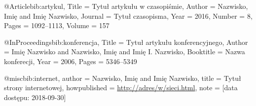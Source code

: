 @Article{bib:artykul,
Title                    = {Tytu{\l} artyku{\l}u w czasopi{\'{s}}mie},
Author                   = {Nazwisko, Imi{\k{e}} and Imi{\k{e}} Nazwisko},
Journal                  = {Tytu{\l} czasopisma},
Year                     = {2016},
Number                   = {8},
Pages                    = {1092--1113},
Volume                   = {157}
}

@InProceedings{bib:konferencja,
  Title                    = {Tytu{\l} artyku{\l}u konferencyjnego},
  Author                   = {Imi{\k{e}} Nazwisko and Nazwisko, Imi{\k{e}} and Imi{\k{e}} I. Nazwisko},
  Booktitle                = {Nazwa konferecji},
  Year                     = {2006},
  Pages                    = {5346--5349}
}

@misc{bib:internet,
  author = {Nazwisko, Imi{\k{e}} and Imi{\k{e}} Nazwisko},
  title = {Tytu{\l} strony internetowej},
  howpublished = {\url{http://adres/w/sieci.html}},
  note = {[data dostępu: 2018-09-30]}
}


